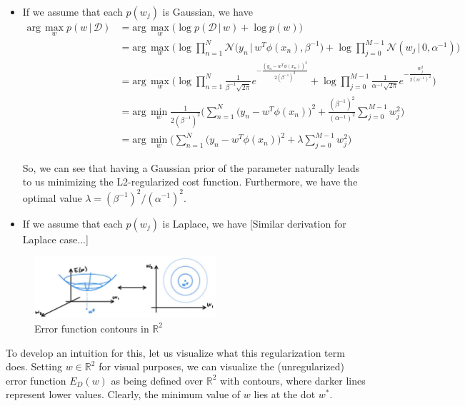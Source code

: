   \begin{itemize}
    \item If we assume that each $p(w_j)$ is Gaussian, we have
    \begin{align*}
      \text{arg}\, \max_w p(w\,|\,\mathcal{D}) & = \text{arg}\, \max_w \Big( \log{p(\mathcal{D}\,|\,w)} + \log{p(w)} \Big) \\
      & = \text{arg}\, \max_w \Bigg( \log \prod_{n=1}^N \mathcal{N}\big(y_n \,|\, w^T \phi(x_n), \beta^{-1} \big) + \log \prod_{j=0}^{M-1} \mathcal{N}(w_j \,|\,0, \alpha^{-1}) \Bigg) \\
      & = \text{arg}\, \max_w \Bigg( \log \prod_{n=1}^N \frac{1}{\beta^{-1} \sqrt{2 \pi}} e^{-\frac{(y_n - w^T \phi(x_n))^2}{2 (\beta^{-1})^2}} + \log \prod_{j=0}^{M-1} \frac{1}{\alpha^{-1} \sqrt{2 \pi}} e^{-\frac{w_j^2}{2 (\alpha^{-1})^2}}\Bigg) \\
      & = \text{arg}\, \min_w \frac{1}{2 (\beta^{-1})^2} \bigg( \sum_{n=1}^N \big( y_n - w^T \phi(x_n)\big)^2 + \frac{(\beta^{-1})^2}{(\alpha^{-1})^2} \sum_{j=0}^{M-1} w_j^2 \bigg) \\
      & = \text{arg}\, \min_w \bigg( \sum_{n=1}^N \big( y_n - w^T \phi(x_n)\big)^2 + \lambda \sum_{j=0}^{M-1} w_j^2 \bigg)
    \end{align*}
    
    So, we can see that having a Gaussian prior of the parameter naturally leads to us minimizing the L2-regularized cost function. Furthermore, we have the optimal value $\lambda = (\beta^{-1})^2/(\alpha^{-1})^2$.

    \item If we assume that each $p(w_j)$ is Laplace, we have
    [Similar derivation for Laplace case...]
  \end{itemize}

  \begin{figure}[H]
    \centering
    \includegraphics[width=0.6\textwidth]{img/ED(W).jpg}
    \caption{Error function contours in $\mathbb{R}^2$}
  \end{figure}

  To develop an intuition for this, let us visualize what this regularization term does. Setting $w \in \mathbb{R}^2$ for visual purposes, we can visualize the (unregularized) error function $E_D (w)$ as being defined over $\mathbb{R}^2$ with contours, where darker lines represent lower values. Clearly, the minimum value of $w$ lies at the dot $w^*$.

